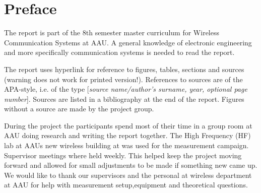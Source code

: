 \chapter*{Preface}\label{ch:forord}%
The report is part of the 8th semester master curriculum for Wireless Communication Systems at \gls{AAU}. A general knowledge of electronic engineering and more specifically communication systems is needed to read the report.

The report uses hyperlink for reference to figures, tables, sections and sources (warning does not work for printed version!). References to sources are of the APA-style, i.e. of the type [\emph{source name/author's surname, year, optional page number}]. Sources are listed in a bibliography at the end of the report. Figures without a source are made by the project group.

During the project the participants spend most of their time in a group room at \gls{AAU} doing research and writing the report together. The High Frequency (HF) lab at \gls{AAU}s new wireless building at was used for the measurement campaign. Supervisor meetings where held weekly. This helped keep the project moving forward and allowed for small adjustments to be made if something new came up. We would like to thank our supervisors and the personal at wireless department at \gls{AAU} for help with measurement setup,equipment and theoretical questions.


